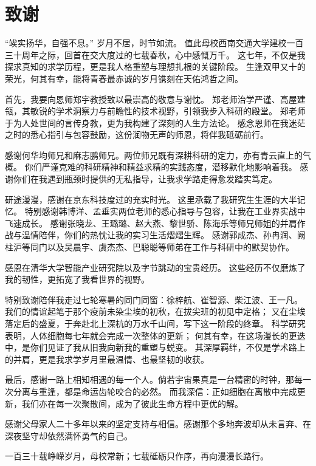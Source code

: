 \chapter*{致\qquad{}谢}
“竢实扬华，自强不息。” 岁月不居，时节如流。
值此母校西南交通大学建校一百三十周年之际，回首在交大度过的七载春秋，心中感慨万千。
这七年，不仅是我探求真知的求学历程，更是我人格重塑与理想扎根的关键阶段。
生逢双甲又十的荣光，何其有幸，能将青春最赤诚的岁月镌刻在天佑鸿哲之间。
\par
首先，我要向恩师郑宇教授致以最崇高的敬意与谢忱。
郑老师治学严谨、高屋建瓴，其敏锐的学术洞察力与前瞻性的技术视野，引领我步入科研的殿堂。
郑老师于为人处世间的言传身教，更为我构建了深刻的人生方法论。
感念恩师在我迷茫之时的悉心指引与包容鼓励，这份润物无声的师恩，将伴我砥砺前行。
\par
感谢何华均师兄和麻志鹏师兄。两位师兄既有深耕科研的定力，亦有青云直上的气概。
你们严谨克难的科研精神和精益求精的实践态度，潜移默化地影响着我。
感谢你们在我遇到瓶颈时提供的无私指导，让我求学路走得愈发踏实笃定。
\par
研途漫漫，感谢在京东科技度过的充实时光。 这里承载了我研究生生涯的大半记忆。
特别感谢韩博洋、孟垂实两位老师的悉心指导与包容，让我在工业界实战中飞速成长。
感谢张晓龙、王璐璐、赵大燕、黎世骄、陈海乐等师兄师姐的并肩作战与温情陪伴，你们的热忱让我的实习生活熠熠生辉。
感谢郭成杰、孙冉润、阙柱沪等同门以及吴晨宇、虞杰杰、巴聪聪等师弟在工作与科研中的默契协作。
\par
感恩在清华大学智能产业研究院以及字节跳动的宝贵经历。
这些经历不仅磨炼了我的韧性，更拓宽了我看世界的视野。
\par
特别致谢陪伴我走过七轮寒暑的同门同窗：徐梓航、崔智源、柴江波、王一凡。
我们的情谊起笔于那个疫前未染尘埃的初秋，在拔尖班的初见中定格；
又在尘埃落定后的盛夏，于奔赴北上深杭的万水千山间，写下这一阶段的终章。
科学研究表明，人体细胞每七年就会完成一次整体的更新；
何其有幸，在这场漫长的更迭中，是你们见证了我从旧我向新我的重塑与蜕变。
其深厚羁绊，不仅是学术路上的并肩，更是我求学岁月里最温情、也最坚韧的收获。
\par
最后，感谢一路上相知相遇的每一个人。倘若宇宙果真是一台精密的时钟，那每一次分离与重逢，都是命运齿轮咬合的必然。
而我深信：正如细胞在离散中完成更新，我们亦在每一次聚散间，成为了彼此生命方程中更优的解。

感谢父母家人二十多年以来的坚定支持与相信。感谢那个多地奔波却从未言弃、在深夜坚守却依然满怀勇气的自己。

一百三十载峥嵘岁月，母校常新；七载砥砺只作序，再向漫漫长路行。

